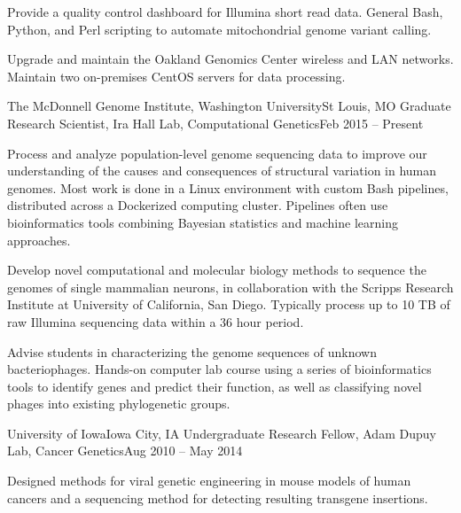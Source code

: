 	    	{Provide a quality control dashboard for Illumina short read data. General Bash, Python, and Perl scripting to automate mitochondrial genome variant calling.}
	    		
	    	{Upgrade and maintain the Oakland Genomics Center wireless and LAN networks. Maintain two on-premises CentOS servers for data processing.}
		
	\resumeItemListEnd
     
        \resumeSubheading
        {The McDonnell Genome Institute, Washington University}{St Louis, MO}
        {Graduate Research Scientist, Ira Hall Lab, Computational Genetics}{Feb 2015 -- Present}

        \resumeItemListStart

            {Process and analyze population-level genome sequencing data to improve our understanding of the causes and consequences of structural variation in human genomes. Most work is done in a Linux environment with custom Bash pipelines, distributed across a Dockerized computing cluster. Pipelines often use bioinformatics tools combining Bayesian statistics and machine learning approaches.}
            
            {Develop novel computational and molecular biology methods to sequence the genomes of single mammalian neurons, in collaboration with the Scripps Research Institute at University of California, San Diego. Typically process up to 10 TB of raw Illumina sequencing data within a 36 hour period.}
            
            {Advise students in characterizing the genome sequences of unknown bacteriophages. Hands-on computer lab course using a series of bioinformatics tools to identify genes and predict their function, as well as classifying novel phages into existing phylogenetic groups.}

        \resumeItemListEnd

        \resumeSubheading
        {University of Iowa}{Iowa City, IA}
        {Undergraduate Research Fellow, Adam Dupuy Lab, Cancer Genetics}{Aug 2010 -- May 2014}

        \resumeItemListStart

            {Designed methods for viral genetic engineering in mouse models of human cancers and a sequencing method for detecting resulting transgene insertions.}
            
